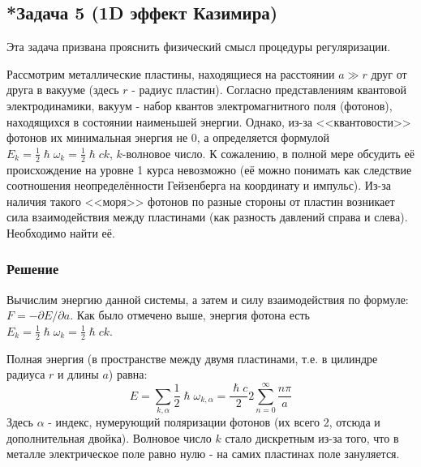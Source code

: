\documentclass[a4paper,12pt]{article}
\begin{document}
\subsection*{*Задача 5 (1D эффект Казимира)}

Эта задача призвана прояснить физический смысл процедуры регуляризации.

\noindent
Рассмотрим металлические пластины, находящиеся на расстоянии $a\gg r$ друг от друга в вакууме (здесь $r$ - радиус пластин). Согласно представлениям квантовой электродинамики, вакуум - набор квантов электромагнитного поля (фотонов), находящихся в состоянии наименьшей энергии. Однако, из-за <<квантовости>> фотонов их минимальная энергия не $0$, а определяется формулой $E_{k}=\frac{1}{2}\hslash\omega_k=\frac{1}{2}\hslash ck$, $k$-волновое число. К сожалению, в полной мере обсудить её происхождение на уровне 1 курса невозможно (её можно понимать как следствие соотношения неопределённости Гейзенберга на координату и импульс). Из-за наличия такого <<моря>> фотонов по разные стороны от пластин возникает сила взаимодействия между пластинами (как разность давлений справа и слева). Необходимо найти её.

\subsubsection*{Решение}
Вычислим энергию данной системы, а затем и силу взаимодействия по формуле: $F=-\partial E/\partial a$. Как было отмечено выше, энергия фотона есть $E_{k}=\frac{1}{2}\hslash\omega_k=\frac{1}{2}\hslash ck$.

\noindent
Полная энергия (в пространстве между двумя пластинами, т.е. в цилиндре радиуса $r$ и длины $a$) равна:
$$
E=\sum_{k,\alpha}\frac{1}{2}\hslash\omega_{k,\alpha}=\frac{\hslash c}{2}2\sum_{n=0}^{\infty}\frac{n\pi}{a}
$$
Здесь $\alpha$ - индекс, нумерующий поляризации фотонов (их всего 2, отсюда и дополнительная двойка). Волновое число $k$ стало дискретным из-за того, что в металле электрическое поле равно нулю - на самих пластинах поле зануляется.
\end{document}

